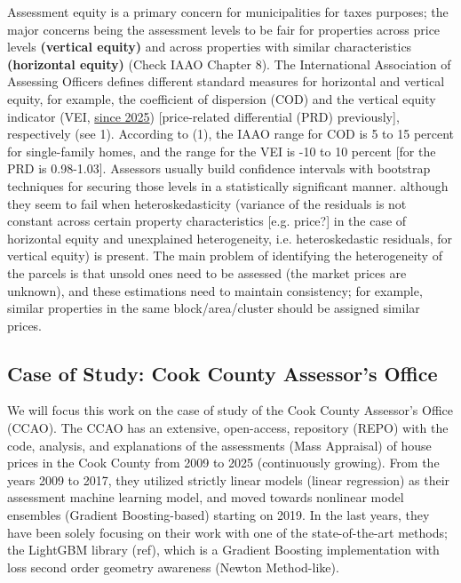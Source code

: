 \documentclass[11pt]{article}
\theoremstyle{plain}
\theoremstyle{definition}
\newcommand{\1}{\mathbf{1}}
\newcommand{\red}[1]{{\color{red} #1}}
\begin{document}
Assessment equity is a primary concern for municipalities for taxes purposes; the major concerns being the assessment levels
to be fair for properties across price levels \textbf{(vertical equity)} and across properties with similar characteristics \textbf{(horizontal equity)} \red{(Check IAAO Chapter 8)}. The International Association of Assessing Officers defines different standard measures for horizontal and vertical equity, for example, the coefficient of dispersion (COD) and the vertical equity indicator (VEI, \href{https://www.iaao.org/about/board-of-directors/governing-documents/ratio-studies-exposure-draft/}{since 2025}) [price-related differential (PRD) previously], respectively \red{(see 1)}. According to \red{(1)}, the IAAO range for COD is 5 to 15 percent for single-family homes, and the range for the VEI is -10 to 10 percent [for the PRD is 0.98-1.03]. Assessors usually build confidence intervals with bootstrap techniques for securing those levels in a statistically significant manner. although they seem to fail when heteroskedasticity (variance of the residuals is not constant across certain property characteristics \red{[e.g. price?]} in the case of horizontal equity and unexplained heterogeneity, i.e. heteroskedastic residuals, for vertical equity) is present. The main problem of identifying the heterogeneity of the parcels is that unsold ones need to be assessed (the market prices are unknown), and these estimations need to maintain consistency; for example, similar properties in the same block/area/cluster should be assigned similar prices. 



\subsection{Case of Study: Cook County Assessor's Office}

We will focus this work on the case of study of the Cook County Assessor's Office (CCAO). The CCAO has an extensive, open-access, repository \red{(REPO)} with the code, analysis, and explanations of  the assessments (Mass Appraisal) of house prices in the Cook County from 2009 to 2025 (continuously growing). From the years 2009 to 2017, they utilized strictly linear models (linear regression) as their assessment machine learning model, and moved towards nonlinear  model ensembles (Gradient Boosting-based) starting on 2019. In the last years, they have been solely focusing on their work with one of the state-of-the-art methods; the LightGBM library \red{(ref)}, which is a Gradient Boosting implementation with loss second order geometry awareness (Newton Method-like). 
\end{document}
